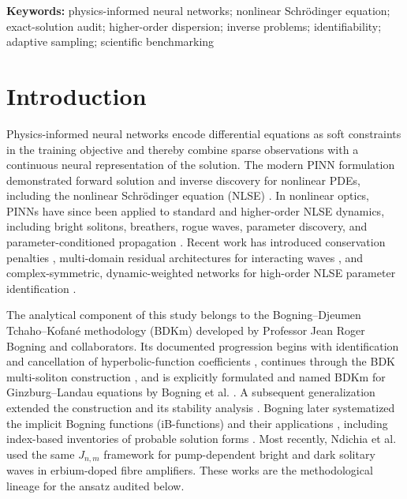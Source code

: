 \documentclass[11pt]{article}
\begin{document}
\noindent\textbf{Keywords:} physics-informed neural networks; nonlinear
Schr\"odinger equation; exact-solution audit; higher-order dispersion;
inverse problems; identifiability; adaptive sampling; scientific benchmarking

\section{Introduction}
\label{sec:introduction}

Physics-informed neural networks encode differential equations as soft
constraints in the training objective and thereby combine sparse observations
with a continuous neural representation of the solution.  The modern PINN
formulation demonstrated forward solution and inverse discovery for nonlinear
PDEs, including the nonlinear Schr\"odinger equation (NLSE)
\citep{raissi2019}.  In nonlinear optics, PINNs have since been applied to
standard and higher-order NLSE dynamics, including bright solitons, breathers,
rogue waves, parameter discovery, and parameter-conditioned propagation
\citep{zhou2021,jiang2022,thulasidharan2024}.  Recent work has introduced
conservation penalties \citep{wu2022optical}, multi-domain residual
architectures for interacting waves \citep{chen2025}, and complex-symmetric,
dynamic-weighted networks for high-order NLSE parameter identification
\citep{su2026}.

The analytical component of this study belongs to the
Bogning--Djeumen Tchaho--Kofan\'e methodology (BDKm) developed by Professor
Jean Roger Bogning and collaborators.  Its documented progression begins with
identification and cancellation of hyperbolic-function coefficients
\citep{djeumen2010}, continues through the BDK multi-soliton construction
\citep{djeumen2011}, and is explicitly formulated and named BDKm for
Ginzburg--Landau equations by Bogning et al. \citep{bogning2012}.  A subsequent generalization
extended the construction and its stability analysis \citep{bogning2012general}.
Bogning later systematized the implicit Bogning functions (iB-functions) and
their applications \citep{bogning2019}, including index-based inventories of
probable solution forms \citep{bogning2021}.  Most recently, Ndichia et al.
\citep{ndichia2026} used the same $J_{n,m}$ framework for pump-dependent bright
and dark solitary waves in erbium-doped fibre amplifiers.  These works are the
methodological lineage for the ansatz audited below.
\end{document}
